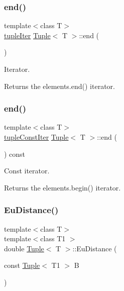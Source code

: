 \subsubsection{\texorpdfstring{end()}{end()}\hspace{0.1cm}{\footnotesize\ttfamily [1/2]}}
{\footnotesize\ttfamily template$<$class T$>$ \\
\mbox{\hyperlink{maths_8hh_ad22dcdeefda7d41523cc1604953eb6cc}{tuple\+Iter}} \mbox{\hyperlink{class_tuple}{Tuple}}$<$ T $>$\+::end (\begin{DoxyParamCaption}{ }\end{DoxyParamCaption})\hspace{0.3cm}{\ttfamily [inline]}}



Iterator. 

\begin{DoxyReturn}{Returns}
the elements.\+end() iterator. 
\end{DoxyReturn}
\mbox{\label{class_tuple_ac55a72437773f17dd8fbccf866d7e7eb}} 
\subsubsection{\texorpdfstring{end()}{end()}\hspace{0.1cm}{\footnotesize\ttfamily [2/2]}}
{\footnotesize\ttfamily template$<$class T$>$ \\
\mbox{\hyperlink{maths_8hh_a2eba794860251c1b30e532df32ee4d1b}{tuple\+Const\+Iter}} \mbox{\hyperlink{class_tuple}{Tuple}}$<$ T $>$\+::end (\begin{DoxyParamCaption}{ }\end{DoxyParamCaption}) const\hspace{0.3cm}{\ttfamily [inline]}}



Const iterator. 

\begin{DoxyReturn}{Returns}
the elements.\+begin() iterator. 
\end{DoxyReturn}
\mbox{\label{class_tuple_a973d6cae203bca0c1ce0d0b65279e433}} 
\subsubsection{\texorpdfstring{EuDistance()}{EuDistance()}}
{\footnotesize\ttfamily template$<$class T$>$ \\
template$<$class T1 $>$ \\
double \mbox{\hyperlink{class_tuple}{Tuple}}$<$ T $>$\+::Eu\+Distance (\begin{DoxyParamCaption}\item[{const \mbox{\hyperlink{class_tuple}{Tuple}}$<$ T1 $>$}]{B }\end{DoxyParamCaption})\hspace{0.3cm}{\ttfamily [inline]}}



